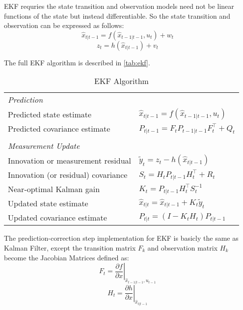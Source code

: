 \gls{EKF} requries the state transition and observation models need not be linear functions of the state but instead differentiable. So the state transition and observation can be expressed as follows: 
$$\hat{x}_{t|t-1} = f(\hat{x}_{t-1|t-1}, u_{t}) + w_{t}$$ 
$$z_{t} = h(\hat{x}_{t|t-1}) + v_{t}$$ 

The full \gls{EKF} algorithm is described in \autoref{tab:ekf}.
\begin{table}[h]
\begin{adjustbox}{max width=\textwidth}
  \centering
  \begin{tabular}{ll}
 \textit{Prediction} & \\
Predicted state estimate & $\hat{x}_{t|t-1} = f(\hat{x}_{t-1|t-1}, u_{t})$ \\
Predicted covariance estimate & $P_{t|t-1} =  {{F_{t}}} P_{t-1|t-1}{ {F_{t}^\top}} + Q_{t}$ \\
&\\
\textit{Measurement Update} & \\
Innovation or measurement residual & $\tilde{y}_{t} = z_{t} - h(\hat{x}_{t|t-1})$ \\
Innovation (or residual) covariance & $S_{t} = {{H_{t}}}P_{t|t-1}{{H_{t}^\top}} + R_{t}$ \\
Near-optimal Kalman gain & $K_{t} = P_{t|t-1}{{H_{t}^\top}}S_{t}^{-1}$ \\
Updated state estimate & $\hat{x}_{t|t} = \hat{x}_{t|t-1} + K_{t}\tilde{y}_{t}$ \\
Updated covariance estimate & $P_{t|t} = (I - K_{t} {{H_{t}}}) P_{t|t-1}$ \\
   
  \end{tabular}
  \end{adjustbox}
  \caption{\gls{EKF} Algorithm}
  \label{tab:ekf}
\end{table}

The prediction-correction step implementation for \gls{EKF} is basicly the same as Kalman Filter, except the transition matrix $F_{k}$ and observation matrix $H_{k}$ become the Jacobian Matrices defined as: \\
$${{F_{t}}} = \left . \frac{\partial f}{\partial x } \right \vert _{\hat{x}_{t-1|t-1},u_{t-1}}$$
$${{H_{t}}} = \left . \frac{\partial h}{\partial x } \right \vert _{\hat{x}_{t|t-1}}$$


